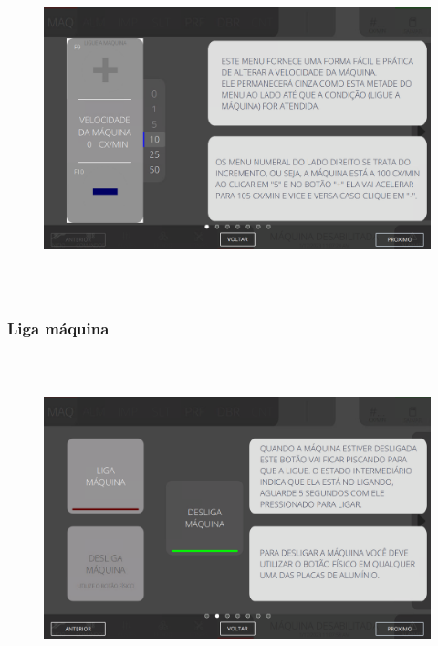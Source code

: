 \vspace*{\fill}

\begin{figure}[h]
  \centering
  \includegraphics[width=576px,height=360px]{src/imagesFlexo/02-machine/e-1.png}
\end{figure}

\vspace*{\fill}

\newpage
\thispagestyle{fancy}

\vspace*{40 pt}

\subsubsection{\small{Liga máquina}}

\vspace*{\fill}

\begin{figure}[h]
  \centering
  \includegraphics[width=576px,height=360px]{src/imagesFlexo/02-machine/e-2.png}
\end{figure}

